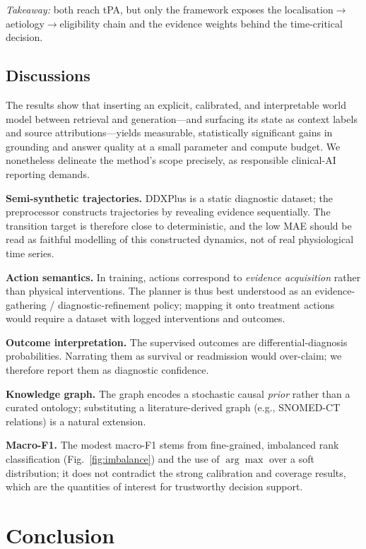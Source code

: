 \documentclass[11pt,a4paper]{report}
\begin{document}
\smallskip
\noindent\textit{Takeaway:} both reach tPA, but only the framework exposes the
localisation$\rightarrow$aetiology$\rightarrow$eligibility chain and the
evidence weights behind the time-critical decision.

\section{Discussions}
\label{sec:discussion}
The results show that inserting an explicit, calibrated, and interpretable world
model between retrieval and generation---and surfacing its state as context
labels and source attributions---yields measurable, statistically significant
gains in grounding and answer quality at a small parameter and compute budget.
We nonetheless delineate the method's scope precisely, as responsible
clinical-AI reporting demands.

\textbf{Semi-synthetic trajectories.} DDXPlus is a static diagnostic dataset;
the preprocessor constructs trajectories by revealing evidence sequentially. The
transition target is therefore close to deterministic, and the low MAE should be
read as faithful modelling of this constructed dynamics, not of real
physiological time series.

\textbf{Action semantics.} In training, actions correspond to \emph{evidence
acquisition} rather than physical interventions. The planner is thus best
understood as an evidence-gathering / diagnostic-refinement policy; mapping it
onto treatment actions would require a dataset with logged interventions and
outcomes.

\textbf{Outcome interpretation.} The supervised outcomes are
differential-diagnosis probabilities. Narrating them as survival or readmission
would over-claim; we therefore report them as diagnostic confidence.

\textbf{Knowledge graph.} The graph encodes a stochastic causal \emph{prior}
rather than a curated ontology; substituting a literature-derived graph (e.g.,
SNOMED-CT relations) is a natural extension.

\textbf{Macro-F1.} The modest macro-F1 stems from fine-grained, imbalanced rank
classification (Fig.~\ref{fig:imbalance}) and the use of $\arg\max$ over a soft
distribution; it does not contradict the strong calibration and coverage
results, which are the quantities of interest for trustworthy decision support.

\chapter{Conclusion}
\end{document}
